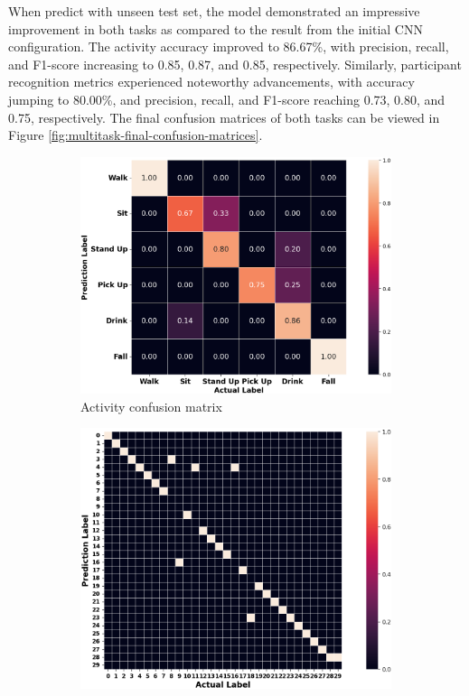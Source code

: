 \documentclass{l4proj}
\begin{document}
When predict with unseen test set, the model demonstrated an impressive improvement in both tasks as compared to the result from the initial CNN configuration. The activity accuracy improved to 86.67\%, with precision, recall, and F1-score increasing to 0.85, 0.87, and 0.85, respectively. Similarly, participant recognition metrics experienced noteworthy advancements, with accuracy jumping to 80.00\%, and precision, recall, and F1-score reaching 0.73, 0.80, and 0.75, respectively. The final confusion matrices of both tasks can be viewed in Figure \ref{fig:multitask-final-confusion-matrices}.

\begin{figure}[h]
   \centering
   \begin{subfigure}{0.49\textwidth}
        \includegraphics[width=\textwidth]{images/multitask-activity-final-test-confusion-matrix.png}
        \caption{Activity confusion matrix}
        \label{fig:multitask-activity-final-test-confusion-matrix}
    \end{subfigure}
    \qquad
    \begin{subfigure}{0.45\textwidth}
        \includegraphics[width=\textwidth]{images/multitask-participant-final-test-confusion-matrix.png}

\end{subfigure}
\end{figure}
\end{document}
